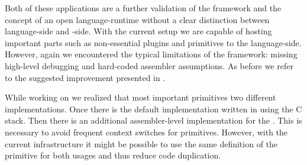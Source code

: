 Both of these applications are a further validation of the \B framework and the concept of an open language-runtime without a clear distinction between language-side and \VM-side.
With the current setup we are capable of hosting important \VM parts such as non-essential plugins and primitives to the language-side.
However, again we encountered the typical limitations of the \B framework: missing high-level debugging and hard-coded assembler assumptions.
As before we refer to the suggested \B improvement presented in .

While working on \NBJ we realized that most important primitives two different implementations.
Once there is the default implementation written in \Slang using the C stack.
Then there is an additional assembler-level implementation for the \JIT.
This is necessary to avoid frequent context switches for primitives.
However, with the current \B infrastructure it might be possible to use the same definition of the primitive for both usages and thus reduce code duplication.

